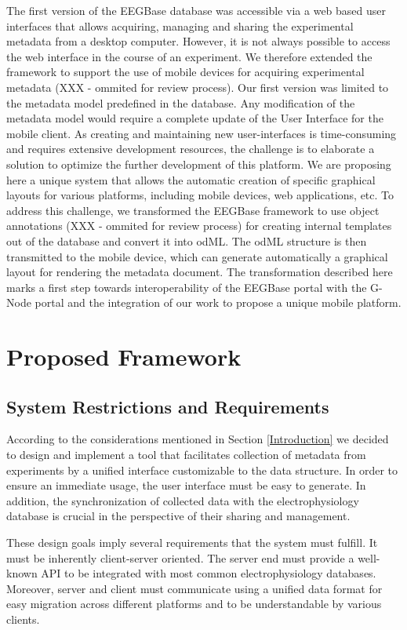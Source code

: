 \documentclass[a4paper,twoside]{article}
\begin{document}
The first version of the EEGBase database was accessible via a web based user interfaces that allows acquiring, managing and sharing the experimental metadata from a desktop computer. However, it is not always possible to access the web interface in the course of an experiment. We therefore extended the framework to support the use of mobile devices for acquiring experimental metadata (XXX - ommited for review process). Our first version was limited to the metadata model predefined in the database. Any modification of the metadata model would require a complete update of the User Interface for the mobile client.
As creating and maintaining new user-interfaces is time-consuming and requires extensive development resources, the challenge is to elaborate a solution to optimize the further development of this platform. We are proposing here a unique system that allows the automatic creation of specific graphical layouts for various platforms, including mobile devices, web applications, etc. To address this challenge, we transformed the EEGBase framework to use object annotations (XXX - ommited for review process) for creating internal templates out of the database and convert it into odML. The odML structure is then transmitted to the mobile device, which can generate automatically a graphical layout for rendering the metadata document.
The transformation described here marks a first step towards interoperability of the EEGBase portal with the G-Node portal and the integration of our work to propose a unique mobile platform.

\section{Proposed Framework}\label{Framework}

\subsection{System Restrictions and Requirements}

According to the considerations mentioned in Section \ref{Introduction} we decided to design and implement a tool that facilitates collection of metadata from experiments by a unified interface customizable to the data structure. In order to ensure an immediate usage, the user interface must be easy to generate. In addition, the synchronization of collected data with the electrophysiology database is crucial in the perspective of their sharing and management.

These design goals imply several requirements that the system must fulfill. It must be inherently client-server oriented. The server end must provide a well-known API to be integrated with most common electrophysiology databases. Moreover, server and client must communicate using a unified data format for easy migration across different platforms and to be understandable by various clients.
\end{document}
